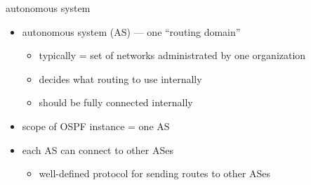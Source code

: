 \begin{frame}{autonomous system}
\begin{itemize}
    \item autonomous system (AS) --- one ``routing domain''
    \begin{itemize}
        \item typically = set of networks administrated by one organization
        \item decides what routing to use internally
        \item should be fully connected internally
    \end{itemize}
    \item scope of OSPF instance = one AS
    \item each AS can connect to other ASes
        \begin{itemize}
        \item well-defined protocol for sending routes to other ASes
        \end{itemize}
\end{itemize}
\end{frame}
